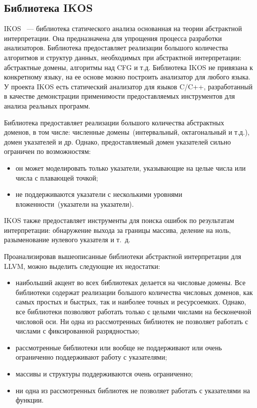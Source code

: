 \subsection{Библиотека IKOS}
IKOS~\cite{ikos} --- библиотека статического анализа основанная на теории 
абстрактной интерпретации. Она предназначена для упрощения процесса разработки 
анализаторов. Библиотека предоставляет реализации большого количества 
алгоритмов и структур данных, необходимых при абстрактной интерпретации: 
абстрактные домены, алгоритмы над CFG и т.д. Библиотека IKOS не привязана к
конкретному языку, на ее основе можно построить анализатор для любого языка.
У проекта IKOS есть статический анализатор для языков C/C++, разработанный
в качестве демонстрации применимости предоставляемых инструментов для анализа
реальных программ.

Библиотека предоставляет реализации большого количества абстрактных доменов, в
том числе: численные домены~(интервальный, октагональный и т.д.), домен 
указателей и др. Однако, предоставляемый домен указателей сильно ограничен
по возможностям:
\begin{itemize}
\item он может моделировать только указатели, указывающие на целые числа или
числа с плавающей точкой;
\item не поддерживаются указатели с несколькими уровнями вложенности~(указатели
на указатели).
\end{itemize}

IKOS также предоставляет инструменты для поиска ошибок по результатам 
интерпретации: обнаружение выхода за границы массива, деление на ноль,
разыменование нулевого указателя и т.~д.

Проанализировав вышеописанные библиотеки абстрактной интерпретации для LLVM,
можно выделить следующие их недостатки:
\begin{itemize}
\item наибольший акцент во всех библиотеках делается на числовые домены. Все 
библиотеки содержат реализации большого количества числовых доменов, как самых
простых и быстрых, так и наиболее точных и ресурсоемких. Однако, все 
библиотеки позволяют работать только с целыми числами на бесконечной числовой
оси. Ни одна из рассмотренных библиотек не позволяет работать с числами с 
фиксированной разрядностью;
\item рассмотренные библиотеки или вообще не поддерживают или очень ограниченно
поддерживают работу с указателями;
\item массивы и структуры поддерживаются очень ограниченно;
\item ни одна из рассмотренных библиотек не позволяет работать с указателями на функции.
\end{itemize}

